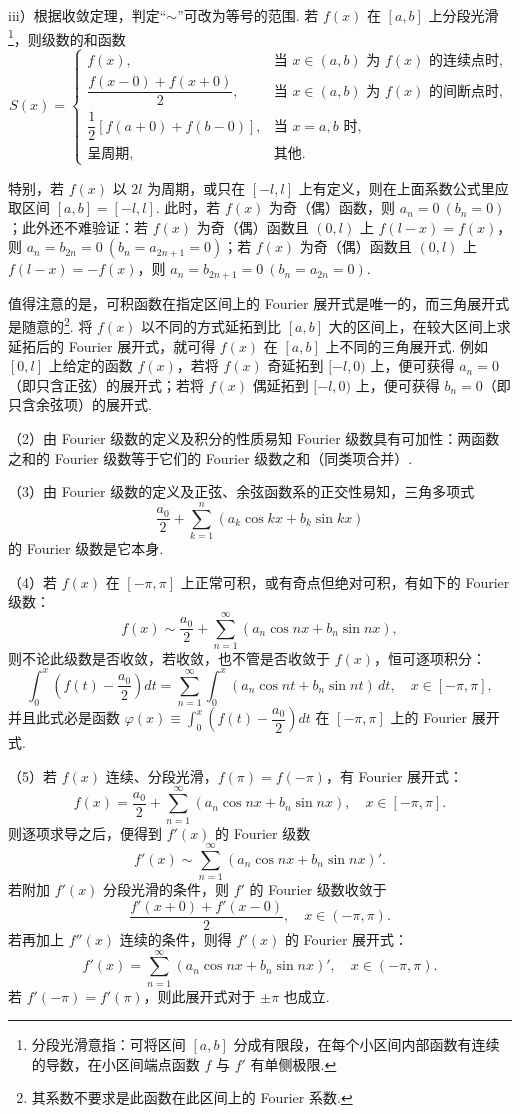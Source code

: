 \documentclass[UTF8, 12pt, fontset=fandol, oneside]{ctexart}
\begin{document}
iii）根据收敛定理，判定“$\sim$”可改为等号的范围. 若 $f(x)$ 在 $[a,b]$ 上分段光滑\footnote{分段光滑意指：可将区间 $[a,b]$ 分成有限段，在每个小区间内部函数有连续的导数，在小区间端点函数 $f$ 与 $f'$ 有单侧极限.}，则级数的和函数
\[
S(x)=
\begin{cases}
f(x),&\text{当 }x\in(a,b)\text{ 为 }f(x)\text{ 的连续点时},\\[3pt]
\dfrac{f(x-0)+f(x+0)}2,&\text{当 }x\in(a,b)\text{ 为 }f(x)\text{ 的间断点时},\\[6pt]
\dfrac12[f(a+0)+f(b-0)],&\text{当 }x=a,b\text{ 时},\\[6pt]
\text{呈周期},&\text{其他}.
\end{cases}
\]

特别，若 $f(x)$ 以 $2l$ 为周期，或只在 $[-l,l]$ 上有定义，则在上面系数公式里应取区间 $[a,b]=[-l,l]$. 此时，若 $f(x)$ 为奇（偶）函数，则 $a_n=0\ (b_n=0)$；此外还不难验证：若 $f(x)$ 为奇（偶）函数且 $(0,l)$ 上 $f(l-x)=f(x)$，则 $a_n=b_{2n}=0\ (b_n=a_{2n+1}=0)$；若 $f(x)$ 为奇（偶）函数且 $(0,l)$ 上 $f(l-x)=-f(x)$，则 $a_n=b_{2n+1}=0\ (b_n=a_{2n}=0)$.

值得注意的是，可积函数在指定区间上的 Fourier 展开式是唯一的，而三角展开式是随意的\footnote{其系数不要求是此函数在此区间上的 Fourier 系数.}. 将 $f(x)$ 以不同的方式延拓到比 $[a,b]$ 大的区间上，在较大区间上求延拓后的 Fourier 展开式，就可得 $f(x)$ 在 $[a,b]$ 上不同的三角展开式. 例如 $[0,l]$ 上给定的函数 $f(x)$，若将 $f(x)$ 奇延拓到 $[-l,0)$ 上，便可获得 $a_n=0$（即只含正弦）的展开式；若将 $f(x)$ 偶延拓到 $[-l,0)$ 上，便可获得 $b_n=0$（即只含余弦项）的展开式.

（2）由 Fourier 级数的定义及积分的性质易知 Fourier 级数具有可加性：两函数之和的 Fourier 级数等于它们的 Fourier 级数之和（同类项合并）.

（3）由 Fourier 级数的定义及正弦、余弦函数系的正交性易知，三角多项式
\[
  \frac{a_0}2+\sum_{k=1}^{n}(a_k\cos kx+b_k\sin kx)
\]
的 Fourier 级数是它本身.

（4）若 $f(x)$ 在 $[-\pi,\pi]$ 上正常可积，或有奇点但绝对可积，有如下的 Fourier 级数：
\[
  f(x)\sim\frac{a_0}2+\sum_{n=1}^{\infty}(a_n\cos nx+b_n\sin nx),
\]
则不论此级数是否收敛，若收敛，也不管是否收敛于 $f(x)$，恒可逐项积分：
\[
  \int_0^x\left(f(t)-\frac{a_0}2\right)dt
  =\sum_{n=1}^{\infty}\int_0^x(a_n\cos nt+b_n\sin nt)\,dt,\quad x\in[-\pi,\pi],
\]
并且此式必是函数 $\varphi(x)\equiv\displaystyle\int_0^x\left(f(t)-\dfrac{a_0}2\right)dt$ 在 $[-\pi,\pi]$ 上的 Fourier 展开式.

（5）若 $f(x)$ 连续、分段光滑，$f(\pi)=f(-\pi)$，有 Fourier 展开式：
\[
  f(x)=\frac{a_0}2+\sum_{n=1}^{\infty}(a_n\cos nx+b_n\sin nx),\quad x\in[-\pi,\pi].
\]
则逐项求导之后，便得到 $f'(x)$ 的 Fourier 级数
\[
  f'(x)\sim\sum_{n=1}^{\infty}(a_n\cos nx+b_n\sin nx)'.
\]
若附加 $f'(x)$ 分段光滑的条件，则 $f'$ 的 Fourier 级数收敛于
\[
  \frac{f'(x+0)+f'(x-0)}2,\quad x\in(-\pi,\pi).
\]
若再加上 $f''(x)$ 连续的条件，则得 $f'(x)$ 的 Fourier 展开式：
\[
  f'(x)=\sum_{n=1}^{\infty}(a_n\cos nx+b_n\sin nx)',\quad x\in(-\pi,\pi).
\]
若 $f'(-\pi)=f'(\pi)$，则此展开式对于 $\pm\pi$ 也成立.
\end{document}
